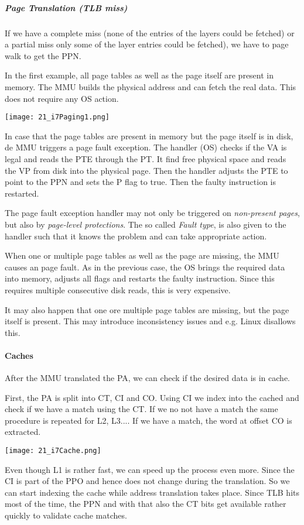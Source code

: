 \subparagraph{Page Translation (TLB miss)}
If we have a complete miss (none of the entries of the layers could be fetched) or a partial miss only some of the layer entries could be fetched), we have to page walk to get the PPN.

In the first example, all page tables as well as the page itself are present in memory. The MMU builds the physical address and can fetch the real data. This does not require any OS action.

\texttt{[image: 21\_i7Paging1.png]}

In case that the page tables are present in memory but the page itself is in disk, de MMU triggers a page fault exception. The handler (OS) checks if the VA is legal and reads the PTE through the PT. It find free physical space and reads the VP from disk into the physical page. Then the handler adjusts the PTE to point to the PPN and sets the P flag to true. Then the faulty instruction is restarted.

The page fault exception handler may not only be triggered on \textit{non-present pages}, but also by \textit{page-level protections}. The so called \textit{Fault type}, is also given to the handler such that it knows the problem and can take appropriate action.

When one or multiple page tables as well as the page are missing, the MMU causes an page fault. As in the previous case, the OS brings the required data into memory, adjusts all flags and restarts the faulty instruction. Since this requires multiple consecutive disk reads, this is very expensive.

It may also happen that one ore multiple page tables are missing, but the page itself is present. This may introduce inconsistency issues and e.g. Linux disallows this.

\paragraph{Caches}
After the MMU translated the PA, we can check if the desired data is in cache.

First, the PA is split into CT, CI and CO. Using CI we index into the cached and check if we have a match using the CT. If we no not have a match the same procedure is repeated for L2, L3.... If we have a match, the word at offset CO is extracted.

\texttt{[image: 21\_i7Cache.png]}

Even though L1 is rather fast, we can speed up the process even more. Since the CI is part of the PPO and hence does not change during the translation. So we can start indexing the cache while address translation takes place. Since TLB hits most of the time, the PPN and with that also the CT bits get available rather quickly to validate cache matches.

